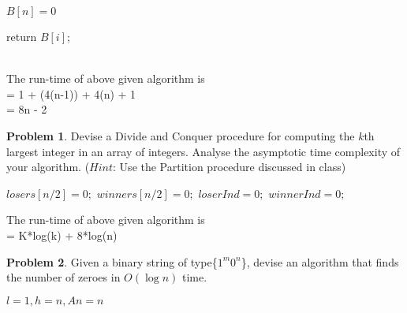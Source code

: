 \documentclass{article}
\theoremstyle{definition}
\newtheorem{Q}{Problem}
\begin{document}
\begin{algorithm}
\caption{}\label{}
\begin{algorithmic}

  \State $B[n] = {0}$
    \EndFor

     \State return $B[i]$;
  \EndIf
    
    \EndFor
   


\EndProcedure
\end{algorithmic}
\end{algorithm}\\
The run-time of above given algorithm is\\  = 1 + (4(n-1)) + 4(n) + 1\\
= 8n - 2
\pagebreak
\begin{Q}
Devise a Divide and Conquer procedure for computing the $k$th largest integer in an array of integers. Analyse the asymptotic time complexity of your algorithm. ($Hint$: Use the Partition procedure discussed in class)
\end{Q}
\begin{algorithm}
\caption{}\label{}
\begin{algorithmic}

 \EndIf
  \State $losers[n/2] =  {0};$
  \State $winners[n/2] =  {0};$
  \State $loserInd =  0;$
  \State $winnerInd =  0;$
   \EndIf
    \EndIf
   \EndFor


\EndProcedure
\end{algorithmic}
\end{algorithm}
The run-time of above given algorithm is\\  = K*log(k) + 8*log(n)\\
\pagebreak
\begin{Q}
Given a binary string of type\{$1^m0^n$\}, devise an algorithm that finds the number of zeroes in $O(\log n)$ time.
\end{Q}
\begin{algorithm}
\caption{}\label{}
\begin{algorithmic}
\State $l=1, h = n, An = n$

 \If{$A[(l+h)/2 == 1 && A[(l+h)/2 + 1== 0$}
 \EndIf
 \If{$A[(l+h)/2 == 0 && A[(l+h)/2 + 1== 0$}
 \EndIf
 \If{$A[(l+h)/2 == 1 && A[(l+h)/2 + 1== 1$}
 \EndIf


\EndProcedure
\end{algorithmic}
\end{algorithm}
\end{document}
